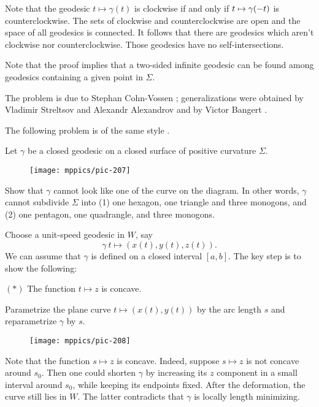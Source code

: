 Note that the geodesic $t\mapsto \gamma(t)$ is clockwise 
if and only if 
$t\z\mapsto \gamma(-t)$
is counterclockwise.
The sets of clockwise and counterclockwise are open and the space of all geodesics is connected. 
It follows that there are geodesics 
which aren't clockwise nor counterclockwise.
Those geodesics have no self-intersections.\qeds

Note that the proof implies that a two-sided infinite geodesic can be found among geodesics containing a given point in $\Sigma$.

The problem is due to Stephan Cohn-Vossen \cite[Satz 9 in][]{convossen};
generalizations were obtained  by 
Vladimir Streltsov and Alexandr Alexandrov 
\cite{streltsov-alexandrov} 
and 
by Victor Bangert \cite{bangert}.

The following problem is of the same style \cite{petrunin-self-crossing-geodesics}.

\begin{pr}
Let $\gamma$ be a closed geodesic on a closed surface of positive curvature $\Sigma$.
\begin{figure}[ht!]
\vskip-0mm
\centering
\texttt{[image: mppics/pic-207]}
\end{figure}
Show that $\gamma$ cannot look like one of the curve on the diagram.
In other words, $\gamma$ cannot subdivide $\Sigma$ into (1) one hexagon, one triangle and three monogons, and (2) one pentagon, one quadrangle, and three monogons.
\end{pr}



Choose a unit-speed geodesic in $W$, say
\[\gamma\:t\mapsto(x(t),y(t),z(t)).\]
We can assume that $\gamma$ is defined on a closed interval $[a,b]$.
The key step is to show the following:

\begin{cl}{$({*})$} 
The function $t\mapsto z$ is concave.
\end{cl}


Parametrize the plane curve $t\mapsto (x(t),y(t))$ by the arc length $s$
and reparametrize $\gamma$ by $s$.

\begin{wrapfigure}{o}{35 mm}
\vskip-0mm
\centering
\texttt{[image: mppics/pic-208]}
\end{wrapfigure}

Note that the function $s\mapsto z$ is concave.
Indeed, suppose $s\mapsto z$ is not concave around $s_0$.
Then one could shorten $\gamma$ by increasing its $z$ component in a small interval around $s_0$, while keeping its endpoints fixed.
After the deformation, the curve still lies in $W$.
The latter contradicts that $\gamma$ is locally length minimizing.

